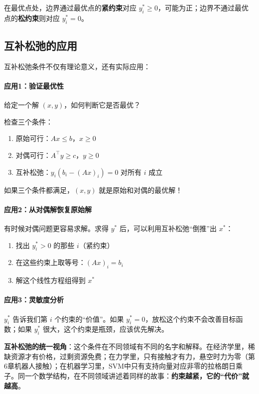 在最优点处，边界通过最优点的\textbf{紧约束}对应 $y_i^* \geq 0$，可能为正；边界不通过最优点的\textbf{松约束}则对应 $y_i^* = 0$。

\subsection{互补松弛的应用}

互补松弛条件不仅有理论意义，还有实际应用：

\paragraph{应用1：验证最优性}

给定一个解 $(x, y)$，如何判断它是否最优？

检查三个条件：
\begin{enumerate}
    \item 原始可行：$Ax \leq b$，$x \geq 0$
    \item 对偶可行：$A^\top y \geq c$，$y \geq 0$
    \item 互补松弛：$y_i(b_i - (Ax)_i) = 0$ 对所有 $i$ 成立
\end{enumerate}

如果三个条件都满足，$(x, y)$ 就是原始和对偶的最优解！

\paragraph{应用2：从对偶解恢复原始解}

有时候对偶问题更容易求解。求得 $y^*$ 后，可以利用互补松弛“倒推”出 $x^*$：

\begin{enumerate}
    \item 找出 $y_i^* > 0$ 的那些 $i$（紧约束）
    \item 在这些约束上取等号：$(Ax)_i = b_i$
    \item 解这个线性方程组得到 $x^*$
\end{enumerate}

\paragraph{应用3：灵敏度分析}

$y_i^*$ 告诉我们第 $i$ 个约束的“价值”。如果 $y_i^* = 0$，放松这个约束不会改善目标函数；如果 $y_i^*$ 很大，这个约束是瓶颈，应该优先解决。

\begin{insightbox}
\textbf{互补松弛的统一视角}：这个条件在不同领域有不同的名字和解释。在经济学里，稀缺资源才有价格，过剩资源免费；在力学里，只有接触才有力，悬空时力为零（第6章机器人接触）；在机器学习里，SVM中只有支持向量对应非零的拉格朗日乘子。同一个数学结构，在不同领域讲述着同样的故事：\textbf{约束越紧，它的“代价”就越高}。
\end{insightbox}

